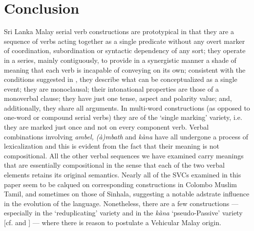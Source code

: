 \section{Conclusion}
Sri Lanka Malay serial verb constructions are prototypical in that they are a sequence of verbs acting together as a single predicate without any overt marker of coordination, subordination or syntactic dependency of any sort; they operate in a series, mainly contiguously, to provide in a synergistic manner a shade of meaning that each verb is incapable of conveying on its own; consistent with the conditions suggested in \citet{Aikhenvald2006}, they describe what can be conceptualized as a single event; they are monoclausal; their intonational properties are those of a monoverbal clause; they have just one tense, aspect and polarity value; and, additionally, they share all arguments. In multi-word constructions (as opposed to one-word or compound serial verbs) they are of the `single marking' variety, i.e. they are marked just once and not on every component verb. Verbal combinations involving \textit{ambel, (à)mbath} and \textit{kàna} have all undergone a process of lexicalization and this is evident from the fact that their meaning is not compositional. All the other verbal sequences we have examined carry meanings that are essentially compositional in the sense that each of the two verbal elements retains its original semantics. Nearly all of the SVCs examined in this paper seem to be calqued on corresponding constructions in Colombo Muslim Tamil, and sometimes on those of Sinhala, suggesting a notable adstrate influence in the evolution of the language. Nonetheless, there are a few constructions --- especially in the `reduplicating' variety  and in the \textit{kàna} `pseudo-Passive' variety [cf.  and ] --- where there is reason to postulate a Vehicular Malay origin. 
 


% 
% 
% 

